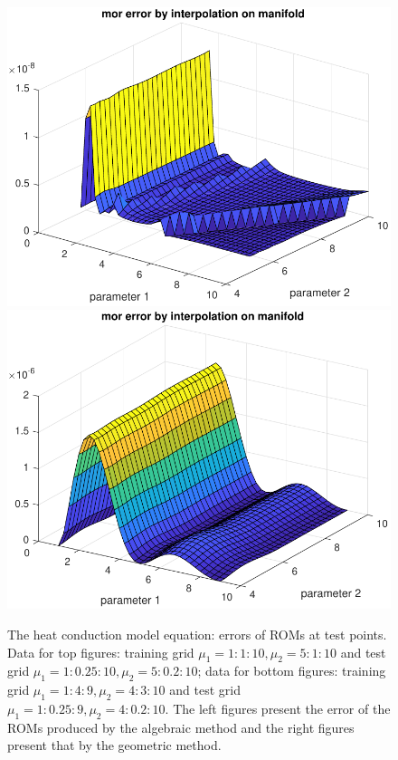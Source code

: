 \begin{figure}[th]
\begin{minipage}{.5\textwidth}
		\includegraphics[width=1\textwidth]{pdfFIG/morerr_maninterp.pdf} \\
		\includegraphics[width=1\textwidth]{pdfFIG/morerr_maninterp3.pdf}
	\end{minipage}
	\caption{The heat conduction model equation: errors of ROMs at test points. Data for top figures: training grid $\mu_1 = 1:1:10, \mu_2 = 5:1:10$ and test grid $\mu_1 = 1:0.25:10, \mu_2 = 5:0.2:10$; data for bottom figures: training grid $\mu_1 = 1:4:9, \mu_2 = 4:3:10$ and test grid $\mu_1 = 1:0.25:9, \mu_2 = 4:0.2:10$. The left figures present the error of the ROMs produced by the algebraic method and the right figures present that by the geometric method.}
	\label{fig:err_example1}
\end{figure}

